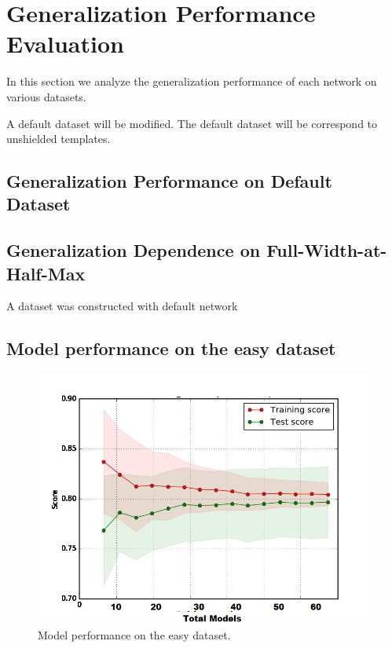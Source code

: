\section{Generalization Performance Evaluation}

In this section we analyze the generalization performance of each network on various datasets. 

A default dataset will be modified. The default dataset will be  correspond to unshielded templates. 

\subsection{Generalization Performance on Default Dataset}







\subsection{Generalization Dependence on Full-Width-at-Half-Max}

A dataset was constructed with default network 



\subsection{Model performance on the easy dataset}


\begin{figure}[H]
	\centering
	\includegraphics[width=0.9\linewidth]{model_choice_hyperparameter_search_images/asymptotic_performance_dummy}
	\caption{Model performance on the easy dataset. }
	\label{fig:asymptotic_performance}
\end{figure}

















